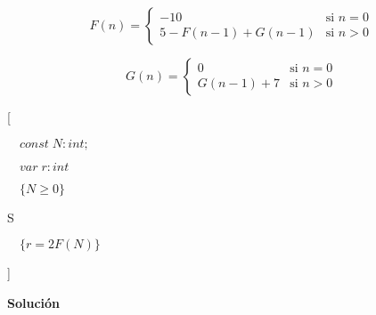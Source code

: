 \documentclass[hidelinks]{article}
\begin{document}
\begin{equation}
	F(n)=
	\begin{cases}
		-10             & \text{si } n=0   \\
		5-F(n-1)+G(n-1) & \text{si } n > 0
	\end{cases}
\end{equation} \par

\begin{equation}
	G(n)=
	\begin{cases}
		0          & \text{si } n=0   \\
		G(n-1) + 7 & \text{si } n > 0
	\end{cases}
\end{equation} \par

[\par
	$\quad const \; N: int;$\par
	$\quad var \; r: int$\par
	$\quad\{N \geq 0\}$\par
	\hspace{1em}     S \par
	$\quad \{r = 2  F(N)\}$ \par
]

\newpage

\textbf{Solución}
\end{document}
